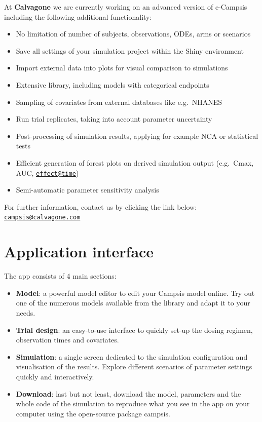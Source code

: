 \documentclass[
]{book}
\providecommand{\tightlist}{%
  \setlength{\itemsep}{0pt}\setlength{\parskip}{0pt}}
\theoremstyle{definition}
\theoremstyle{definition}
\theoremstyle{definition}
\theoremstyle{definition}
\theoremstyle{remark}
\begin{document}
At \textbf{Calvagone} we are currently working on an advanced version of e-Campsis including the following additional functionality:

\begin{itemize}
\tightlist
\item
  No limitation of number of subjects, observations, ODEs, arms or scenarios
\item
  Save all settings of your simulation project within the Shiny environment
\item
  Import external data into plots for visual comparison to simulations
\item
  Extensive library, including models with categorical endpoints
\item
  Sampling of covariates from external databases like e.g.~NHANES
\item
  Run trial replicates, taking into account parameter uncertainty
\item
  Post-processing of simulation results, applying for example NCA or statistical tests
\item
  Efficient generation of forest plots on derived simulation output (e.g.~Cmax, AUC, \href{mailto:effect@time}{\nolinkurl{effect@time}})
\item
  Semi-automatic parameter sensitivity analysis
\end{itemize}

For further information, contact us by clicking the link below: \href{mailto:campsis@calvagone.com}{\nolinkurl{campsis@calvagone.com}}

\hypertarget{application-interface}{%
\section{Application interface}\label{application-interface}}

The app consists of 4 main sections:

\begin{itemize}
\tightlist
\item
  \textbf{Model}: a powerful model editor to edit your Campsis model online. Try out one of the numerous models available from the library and adapt it to your needs.
\item
  \textbf{Trial design}: an easy-to-use interface to quickly set-up the dosing regimen, observation times and covariates.
\item
  \textbf{Simulation}: a single screen dedicated to the simulation configuration and visualisation of the results. Explore different scenarios of parameter settings quickly and interactively.
\item
  \textbf{Download}: last but not least, download the model, parameters and the whole code of the simulation to reproduce what you see in the app on your computer using the open-source package campsis.
\end{itemize}
\end{document}

